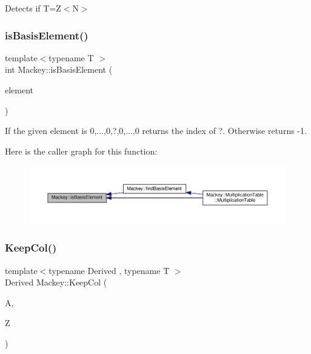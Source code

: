 Detects if T=Z$<$\+N$>$ 

\mbox{\label{namespaceMackey_a69fa6a0eac2520c76251b0799fa9357f}} 
\subsubsection{\texorpdfstring{is\+Basis\+Element()}{isBasisElement()}}
{\footnotesize\ttfamily template$<$typename T $>$ \\
int Mackey\+::is\+Basis\+Element (\begin{DoxyParamCaption}\item[{const T \&}]{element }\end{DoxyParamCaption})}



If the given element is 0,...,0,?,0,...,0 returns the index of ?. Otherwise returns -\/1. 

Here is the caller graph for this function\+:\nopagebreak
\begin{figure}[H]
\begin{center}
\leavevmode
\includegraphics[width=350pt]{namespaceMackey_a69fa6a0eac2520c76251b0799fa9357f_icgraph}
\end{center}
\end{figure}
\mbox{\label{namespaceMackey_a782d9ce52543c3ae3520b4859dda3240}} 
\subsubsection{\texorpdfstring{Keep\+Col()}{KeepCol()}}
{\footnotesize\ttfamily template$<$typename Derived , typename T $>$ \\
Derived Mackey\+::\+Keep\+Col (\begin{DoxyParamCaption}\item[{const Eigen\+::\+Dense\+Base$<$ Derived $>$ \&}]{A,  }\item[{const std\+::vector$<$ T $>$ \&}]{Z }\end{DoxyParamCaption})}



